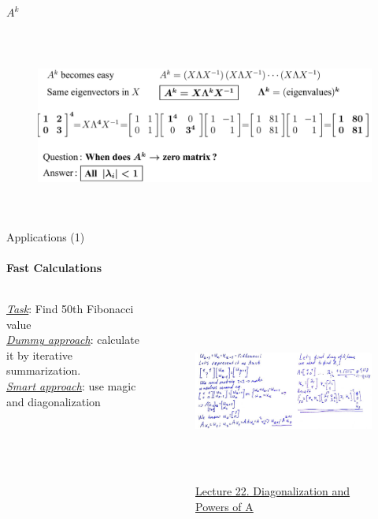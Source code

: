 \documentclass[aspectratio=169]{beamer}
\begin{document}
\begin{frame}[t]{$A^k$}
\framesubtitle{}
    \begin{figure}[H]
        \centering\includegraphics[height=6cm,width=1\textwidth,keepaspectratio]{Power.png}
        \label{fig:Power.png}
    \end{figure}
\end{frame}


\begin{frame}[t]{Applications (1)}
    \framesubtitle{Fast Calculations}
            \begin{columns}[T,onlytextwidth]
                \begin{column}{0.3\textwidth}
                    \underline{\textit{Task}}: Find 50th Fibonacci value \\
\textit{\underline{Dummy approach}}: calculate it by iterative summarization. \\
\underline{\textit{Smart approach}}: use magic and diagonalization \\ 
                \end{column}
                \begin{column}{0.69\textwidth}
                    \begin{figure}[H]
                        \centering\includegraphics[height=6cm,width=1\textwidth,keepaspectratio]{fibo.jpg}
                        \caption*{ \Large \href{https://youtu.be/13r9QY6cmjc?t=2072}{Lecture 22. Diagonalization and Powers of A}}
                        \label{fig:fibo.jpg}
                    \end{figure}
                \end{column}
            \end{columns}
\end{frame}
\end{document}
